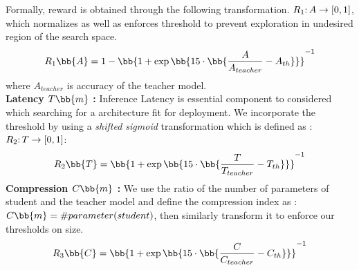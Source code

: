 \documentclass[../main]{subfiles}
\begin{document}
        Formally, reward is obtained through the following transformation.
        $R_1\mathpunct{:} A \rightarrow [0,1]$, which normalizes as well as enforces threshold to prevent exploration in undesired region of the search space.
            \begin{equation}
                R_1 \bb{A} = 1 - \inv{\bb{1+\exp\bb{15\cdot\bb{\frac{A}{A_{teacher}}-A_{th}}}}}
            \end{equation}
        where $A_{teacher}$ is accuracy of the teacher model. \\
        \textbf{Latency $T \bb{m}$ :} Inference Latency is essential component to considered which searching for a architecture fit for deployment.
        We incorporate the threshold by using a \textit{shifted sigmoid} transformation which is defined as : \\
        $R_2\mathpunct{:} T \rightarrow [0,1]$:
        \begin{equation}
                R_2 \bb{T} = \inv{\bb{1+\exp\bb{15\cdot\bb{\frac{T}{T_{teacher}}-T_{th}}}}}
        \end{equation}
        \textbf{Compression $C \bb{m}$ :} We use the ratio of the number of parameters of student and the teacher model and define the compression index as :\\
        $ C \bb{m} =  \#parameter(student)$, then similarly transform it to enforce our thresholds on size.\\
         \begin{equation}
                R_3 \bb{C} = \inv{\bb{1+\exp\bb{15\cdot\bb{\frac{C}{C_{teacher}}-C_{th}}}}}
        \end{equation}
\end{document}
